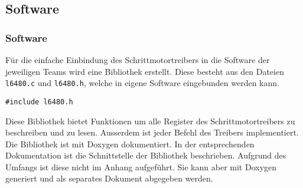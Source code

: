     \subsection{Software}   \label{ch:Software} 
    \fi
    \ifEMBED
    \subsubsection{Software} \label{ch:Software}
    \fi
    Für die einfache Einbindung des Schrittmotortreibers in die Software der 
    jeweiligen Teams wird eine Bibliothek erstellt. Diese besteht aus den 
    Dateien \verb?l6480.c? und \verb?l6480.h?, welche in eigene Software 
    eingebunden werden kann. 
    \begin{lstlisting}[caption={Einbinden der Bibliothek}]
#include l6480.h
    \end{lstlisting}
    Diese Bibliothek bietet Funktionen um alle Register des 
    Schrittmotortreibers zu beschreiben und zu lesen. Ausserdem ist jeder 
    Befehl des Treibers implementiert. Die Bibliothek ist mit Doxygen 
    dokumentiert. In der entsprechenden Dokumentation ist die Schnittstelle 
    der Bibliothek beschrieben. Aufgrund des Umfangs ist diese nicht im Anhang 
    aufgeführt. Sie kann aber mit Doxygen generiert und als separates Dokument 
    abgegeben werden. 

